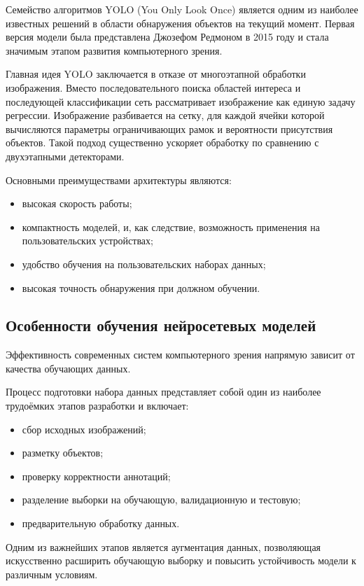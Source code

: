 Семейство алгоритмов YOLO (You Only Look Once) является одним из наиболее известных решений в области обнаружения объектов на текущий момент. Первая версия модели была представлена Джозефом Редмоном в 2015 году и стала значимым этапом развития компьютерного зрения.

Главная идея YOLO заключается в отказе от многоэтапной обработки изображения. Вместо последовательного поиска областей интереса и последующей классификации сеть рассматривает изображение как единую задачу регрессии. Изображение разбивается на сетку, для каждой ячейки которой вычисляются параметры ограничивающих рамок и вероятности присутствия объектов. Такой подход существенно ускоряет обработку по сравнению с двухэтапными детекторами.

Основными преимуществами архитектуры являются:

\begin{itemize}
	\item высокая скорость работы;
	\item компактность моделей, и, как следствие, возможность применения на пользовательских устройствах;
	\item удобство обучения на пользовательских наборах данных;
	\item высокая точность обнаружения при должном обучении.
\end{itemize}

\subsection{Особенности обучения нейросетевых моделей}

Эффективность современных систем компьютерного зрения напрямую зависит от качества обучающих данных.

Процесс подготовки набора данных представляет собой один из наиболее трудоёмких этапов разработки и включает:

\begin{itemize}
	\item сбор исходных изображений;
	\item разметку объектов;
	\item проверку корректности аннотаций;
	\item разделение выборки на обучающую, валидационную и тестовую;
	\item предварительную обработку данных.
\end{itemize}

Одним из важнейших этапов является аугментация данных, позволяющая искусственно расширить обучающую выборку и повысить устойчивость модели к различным условиям.

